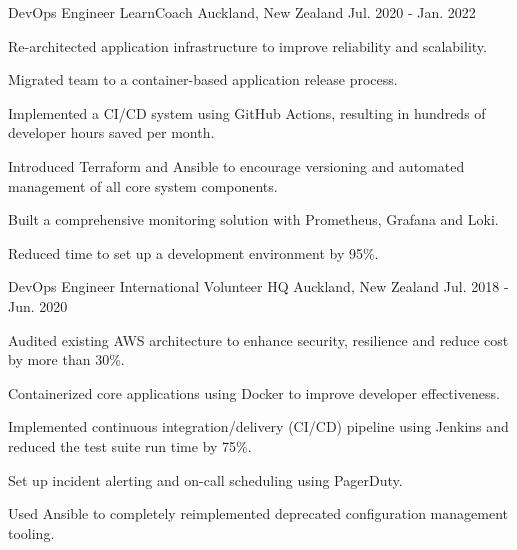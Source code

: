 \begin{cventries}

\cventry
{DevOps Engineer} %
{LearnCoach} %
{Auckland, New Zealand} %
{Jul. 2020 - Jan. 2022} %
{ %
\begin{cvitems}
\item {Re-architected application infrastructure to improve reliability and scalability.}
\item {Migrated team to a container-based application release process.}
\item {Implemented a CI/CD system using GitHub Actions, resulting in hundreds of developer hours saved per month.}
\item {Introduced Terraform and Ansible to encourage versioning and automated management of all core system components.}
\item {Built a comprehensive monitoring solution with Prometheus, Grafana and Loki.}
\item {Reduced time to set up a development environment by 95\%.}
\end{cvitems}
}


\cventry
{DevOps Engineer} %
{International Volunteer HQ} %
{Auckland, New Zealand} %
{Jul. 2018 - Jun. 2020} %
{ %
\begin{cvitems}
\item {Audited existing AWS architecture to enhance security, resilience and reduce cost by more than 30\%.}
\item {Containerized core applications using Docker to improve developer effectiveness.}
\item {Implemented continuous integration/delivery (CI/CD) pipeline using Jenkins and reduced the test suite run time by 75\%.}
\item {Set up incident alerting and on-call scheduling using PagerDuty.}
\item {Used Ansible to completely reimplemented deprecated configuration management tooling.}
\end{cvitems}
}



\end{cventries}
